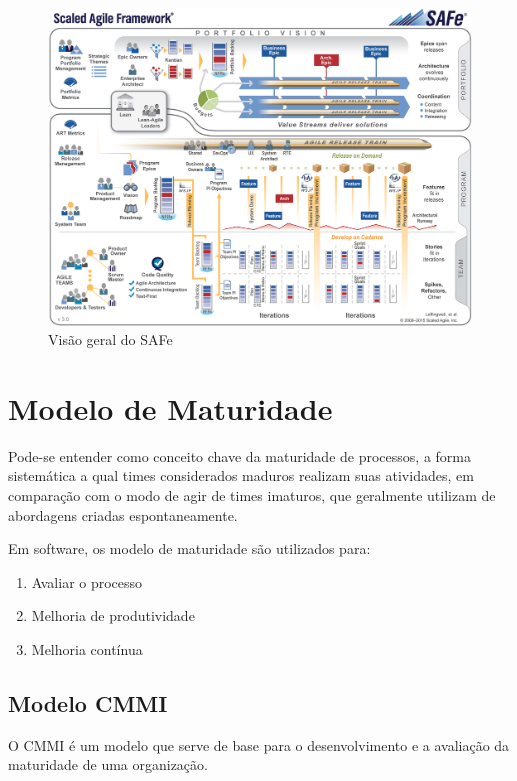 \begin{figure}[H]
    \centering
  \includegraphics[keepaspectratio=true,scale=0.13]{figuras/SAFe_Big_Picture.eps}
    \caption{Visão geral do SAFe}
    \label{fig:safe}
\end{figure}

\section{Modelo de Maturidade}

Pode-se entender como conceito chave da maturidade de processos, a forma sistemática
a qual times considerados maduros realizam suas atividades, em comparação com o modo
de agir de times imaturos, que geralmente utilizam de abordagens criadas espontaneamente.\cite{artigonal}

Em software, os modelo de maturidade são utilizados para:

\begin{enumerate}
  \item Avaliar o processo
  \item Melhoria de produtividade
  \item Melhoria contínua
\end{enumerate}

\subsection{Modelo CMMI}

O CMMI é um modelo que serve de base para o desenvolvimento e a avaliação da maturidade de uma organização.

